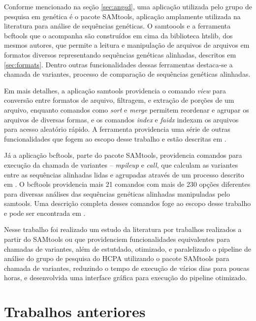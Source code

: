 \documentclass[cic,tc]{iiufrgs}
\begin{document}
Conforme mencionado na seção \ref{sec:angsd}, uma aplicação utilizada pelo
grupo de pesquisa em genética é o pacote SAMtools,\cite{li2009sequence}
aplicação amplamente utilizada na literatura para análise de sequências
genéticas.\cite{danecek2021twelve} O samtoools e a ferramenta bcftools que o
acompanha são construídos em cima da biblioteca htslib, dos mesmos autores, que
permite a leitura e manipulação de arquivos de arquivos em formatos diversos
representando sequências genéticas alinhadas, descritos em \ref{sec:formats}.
Dentro outras funcionalidades dessas ferramentas destaca-se a chamada de
variantes, processo de comparação de sequências genéticas
alinhadas.\cite{danecek2021twelve}

Em mais detalhes, a aplicação samtools providencia o comando \textit{view} para
conversão entre formatos de arquivo, filtragem, e extração de porções de um
arquivo, enquanto comandos como \textit{sort} e \textit{merge} permitem
reordenar e agrupar os arquivos de diversas formas, e os comandos
\textit{index} e \textit{faidx} indexam os arquivos para acesso aleatório
rápido. A ferramenta providencia uma série de outras funcionalidades que fogem
ao escopo desse trabalho e estão descritas em \cite{danecek2021twelve}.

Já a aplicação bcftools, parte do pacote SAMtools, providencia comandos para
execução da chamada de variantes -- \textit{mpileup} e \textit{call}, que
calculam as variantes entre as sequências alinhadas lidas e agrupadas através
de um processo descrito em \cite{li2011improving}. O bcftools providencia mais
21 comandos com mais de 230 opções diferentes para diversas análises das
sequências genéticas alinhadas manipuladas pelo samtools. Uma descrição
completa desses comandos foge ao escopo desse trabalho e pode ser encontrada em
\cite{danecek2021twelve}.

Nesse trabalho foi realizado um estudo da literatura por trabalhos realizados a
partir do SAMtools ou que providenciem funcionalidades equivalentes para
chamadas de variantes, além de estutdado, otimizado, e paralelizado o pipeline
de análise do grupo de pesquisa do HCPA utilizando o pacote SAMtools para
chamada de variantes, reduzindo o tempo de execução de vários dias para poucas
horas, e desenvolvida uma interface gráfica para execução do pipeline
otimizado.

\section{Trabalhos anteriores}
\end{document}
